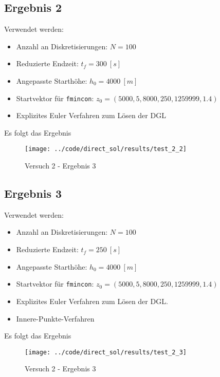\newpage
\subsection{Ergebnis 2}\label{kap:Versuch22}
Verwendet werden:
\begin{itemize}
\item Anzahl an Diskretisierungen: $N = 100$ 
\item Reduzierte Endzeit: $t_f = 300 \ [s]$
\item Angepasste Starthöhe: $h_0 = 4000 \ [m]$
\item Startvektor für \texttt{fmincon}: $z_0 = (5000,5,8000,250,1259999,1.4)$
\item Explizites Euler Verfahren zum Lösen der DGL
\end{itemize}
Es folgt das Ergebnis
\begin{figure}[H]
\begin{center}
\texttt{[image: ../code/direct\_sol/results/test\_2\_2]}
\caption{Versuch 2 - Ergebnis 3}\label{img:test_2_2}
\end{center}
\end{figure}

\newpage
\subsection{Ergebnis 3}\label{kap:Versuch23}
Verwendet werden:
\begin{itemize}
\item Anzahl an Diskretisierungen: $N = 100$ 
\item Reduzierte Endzeit: $t_f = 250 \ [s]$
\item Angepasste Starthöhe: $h_0 = 4000 \ [m]$
\item Startvektor für \texttt{fmincon}: $z_0 = (5000,5,8000,250,1259999,1.4)$
\item Explizites Euler Verfahren zum Lösen der DGL.
%
\item Innere-Punkte-Verfahren
\end{itemize}
Es folgt das Ergebnis
\begin{figure}[H]
\begin{center}
\texttt{[image: ../code/direct\_sol/results/test\_2\_3]}
\caption{Versuch 2 - Ergebnis 3}\label{img:test_23}
\end{center}
\end{figure}














